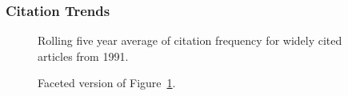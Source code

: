 \documentclass[
  10pt,
  letterpaper,
  DIV=11,
  numbers=noendperiod,
  twoside]{scrartcl}
\begin{document}
\subsubsection*{Citation Trends}\label{sec-trends-1991}

\begin{figure}


\caption{\label{fig-citation-spaghetti-1991}Rolling five year average of
citation frequency for widely cited articles from 1991.}

\end{figure}%

\begin{figure}


\caption{\label{fig-citation-facet-1991}Faceted version of
Figure~\ref{fig-citation-spaghetti-1991}.}

\end{figure}%
\end{document}
